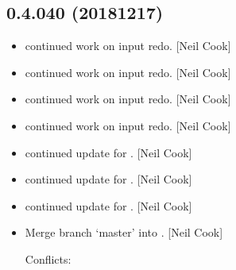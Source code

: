 \documentclass[a4paper,10pt,english]{report}
\begin{document}
\subsection{0.4.040 (2018\sphinxhyphen{}12\sphinxhyphen{}17)}
\label{\detokenize{misc/changelog:id247}}\begin{itemize}
\item {} 
 \sphinxhyphen{} continued work on input redo. {[}Neil Cook{]}

\item {} 
 \sphinxhyphen{} continued work on input redo. {[}Neil Cook{]}

\item {} 
 \sphinxhyphen{} continued work on input redo. {[}Neil Cook{]}

\item {} 
 \sphinxhyphen{} continued work on input redo. {[}Neil Cook{]}

\item {} 
 \sphinxhyphen{} continued update for . {[}Neil Cook{]}

\item {} 
 \sphinxhyphen{} continued update for . {[}Neil Cook{]}

\item {} 
 \sphinxhyphen{} continued update for . {[}Neil Cook{]}

\item {} 
Merge branch ‘master’ into . {[}Neil Cook{]}
\begin{description}
\item[{Conflicts:}] \leavevmode
{}

\end{description}

\end{itemize}
\end{document}
